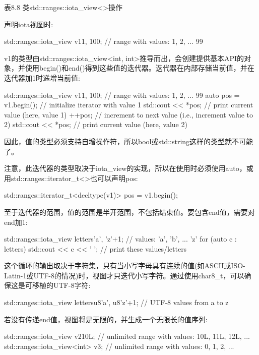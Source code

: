 \begin{center}
表8.8 类std::ranges::iota\_view<>操作
\end{center}

声明iota视图时:

\begin{cpp}
std::ranges::iota_view v1{1, 100}; // range with values: 1, 2, ... 99
\end{cpp}

v1的类型由std::ranges::iota\_view<int, int>推导而出，会创建提供基本API的对象，并使用begin()和end()得到这些值的迭代器。迭代器在内部存储当前值，并在迭代器加1时递增当前值:

\begin{cpp}
std::ranges::iota_view v1{1, 100}; // range with values: 1, 2, ... 99
auto pos = v1.begin(); // initialize iterator with value 1
std::cout << *pos; // print current value (here, value 1)
++pos; // increment to next value (i.e., increment value to 2)
std::cout << *pos; // print current value (here, value 2)
\end{cpp}

因此，值的类型必须支持自增操作符，所以bool或std::string这样的类型就不可能了。

注意，此迭代器的类型取决于iota\_view的实现，所以在使用时必须使用auto，或用std::ranges::iterator\_t<>也可以声明pos:

\begin{cpp}
std::ranges::iterator_t<decltype(v1)> pos = v1.begin();
\end{cpp}

至于迭代器的范围，值的范围是半开范围，不包括结束值。要包含end值，需要对end加1:

\begin{cpp}
std::ranges::iota_view letters{'a', 'z'+1}; // values: ’a’, ’b’, ... ’z’
for (auto c : letters) {
	std::cout << c << ' '; // print these values/letters
}
\end{cpp}

这个循环的输出取决于字符集，只有当小写字母具有连续的值(如ASCII或ISO-Latin-1或UTF-8的情况)时，视图才只迭代小写字符。通过使用char8\_t，可以确保这是可移植的UTF-8字符:

\begin{cpp}
std::ranges::iota_view letters{u8'a', u8'z'+1}; // UTF-8 values from a to z
\end{cpp}

若没有传递end值，视图将是无限的，并生成一个无限长的值序列:

\begin{cpp}
std::ranges::iota_view v2{10L}; // unlimited range with values: 10L, 11L, 12L, ...
std::ranges::iota_view<int> v3; // unlimited range with values: 0, 1, 2, ...
\end{cpp}

